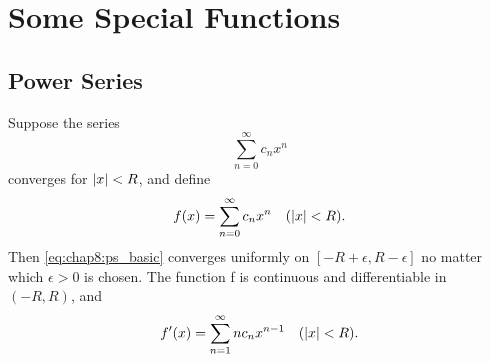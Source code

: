 
\chapter{Some Special Functions}
\label{chap:rudin8}

\section{Power Series}
\label{sec:chap8:power_series}


\begin{theorem} %
  \label{thm:chap8:power_series_props}
  Suppose the series
  \begin{equation} \label{eq:chap8:ps_basic}
    \sum_{n=0}^\infty c_n x^n
  \end{equation}
  converges for $\left\lvert x \right\rvert < R$, and define
  \begin{equation} \label{eq:chap8:ps_func_def}
    f(x) = \sum_{n=0}^\infty c_n x^n \quad (\left\lvert x \right\rvert < R).
  \end{equation}
  Then \eqref{eq:chap8:ps_basic} converges uniformly on
  $[-R+\epsilon, R-\epsilon]$ no matter which $\epsilon > 0$ is
  chosen. The function f is continuous and differentiable in $(-R, R)$, and
  \begin{equation} \label{eq:chap8:ps_derivative}
    f'(x) = \sum_{n=1}^\infty n c_n x^{n-1} \quad (\left\lvert x \right\rvert < R).
  \end{equation}
\end{theorem}

